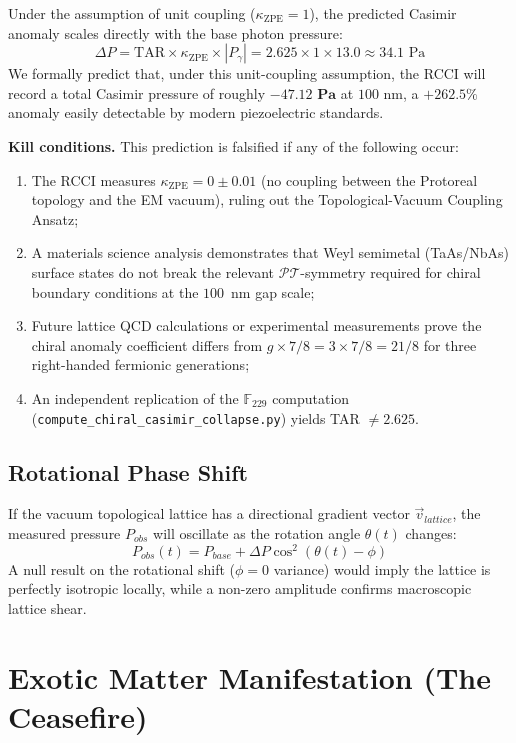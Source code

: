 Under the assumption of unit coupling ($\kappa_{\text{ZPE}} = 1$), the predicted Casimir anomaly scales directly with the base photon pressure:
\begin{equation}
    \Delta P = \text{TAR} \times \kappa_{\text{ZPE}} \times |P_\gamma| = 2.625 \times 1 \times 13.0 \approx 34.1\text{ Pa}
\end{equation}
We formally predict that, under this unit-coupling assumption, the RCCI will record a total Casimir pressure of roughly $\mathbf{-47.12\text{ Pa}}$ at $100\text{ nm}$, a $+262.5\%$ anomaly easily detectable by modern piezoelectric standards.

\textbf{Kill conditions.} This prediction is falsified if any of the following occur:
\begin{enumerate}
    \item The RCCI measures $\kappa_{\text{ZPE}} = 0 \pm 0.01$ (no coupling between the Protoreal topology and the EM vacuum), ruling out the Topological-Vacuum Coupling Ansatz;
    \item A materials science analysis demonstrates that Weyl semimetal (TaAs/NbAs) surface states do not break the relevant $\mathcal{PT}$-symmetry required for chiral boundary conditions at the $100$~nm gap scale;
    \item Future lattice QCD calculations or experimental measurements prove the chiral anomaly coefficient differs from $g \times 7/8 = 3 \times 7/8 = 21/8$ for three right-handed fermionic generations;
    \item An independent replication of the $\mathbb{F}_{229}$ computation (\texttt{compute\_chiral\_casimir\_collapse.py}) yields TAR $\neq 2.625$.
\end{enumerate}

\subsection{Rotational Phase Shift}\label{sec:phase}
If the vacuum topological lattice has a directional gradient vector $\vec{v}_{lattice}$, the measured pressure $P_{obs}$ will oscillate as the rotation angle $\theta(t)$ changes:
\begin{equation}
    P_{obs}(t) = P_{base} + \Delta P \cos^2(\theta(t) - \phi)
\end{equation}
A null result on the rotational shift ($\phi = 0$ variance) would imply the lattice is perfectly isotropic locally, while a non-zero amplitude confirms macroscopic lattice shear.

\section{Exotic Matter Manifestation (The Ceasefire)}\label{sec:ceasefire}

